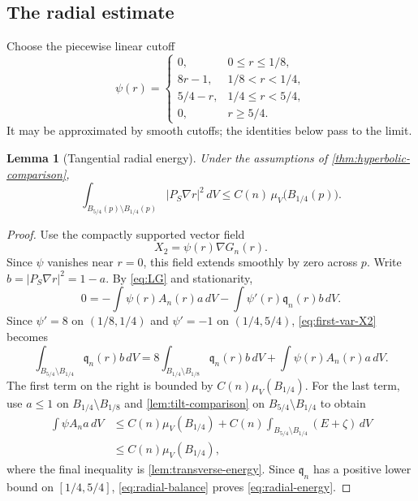 \documentclass[11pt,reqno]{amsart}
\numberwithin{equation}{section}
\newtheorem{lemma}[lemma]{Lemma}
\theoremstyle{definition}
\theoremstyle{remark}
\begin{document}
\subsection{The radial estimate}\label{sec:radial}

Choose the piecewise linear cutoff
\begin{equation}\label{eq:psi}
 \psi(r)=
 \begin{cases}
 0,&0\le r\le1/8,\\
 8r-1,&1/8<r<1/4,\\
 5/4-r,&1/4\le r<5/4,\\
 0,&r\ge5/4.
 \end{cases}
\end{equation}
It may be approximated by smooth cutoffs; the identities below pass to the limit.

\begin{lemma}[Tangential radial energy]\label{lem:radial-energy}
Under the assumptions of \cref{thm:hyperbolic-comparison},
\begin{equation}\label{eq:radial-energy}
 \int_{B_{5/4}(p)\setminus B_{1/4}(p)}|P_S\nabla r|^2\,dV
 \le C(n)\,\mu_V\bigl(B_{1/4}(p)\bigr).
\end{equation}
\end{lemma}

\begin{proof}
Use the compactly supported vector field
\[
 X_2=\psi(r)\nabla G_n(r).
\]
Since $\psi$ vanishes near $r=0$, this field extends smoothly by zero across
$p$.
Write $b=|P_S\nabla r|^2=1-a$.  By \eqref{eq:LG} and stationarity,
\begin{equation}\label{eq:first-var-X2}
 0=-\int\psi(r)A_n(r)a\,dV
   -\int\psi'(r)\mathfrak q_n(r)b\,dV.
\end{equation}
Since $\psi'=8$ on $(1/8,1/4)$ and $\psi'=-1$ on $(1/4,5/4)$, \eqref{eq:first-var-X2} becomes
\begin{equation}\label{eq:radial-balance}
 \int_{B_{5/4}\setminus B_{1/4}}\mathfrak q_n(r)b\,dV
 =8\int_{B_{1/4}\setminus B_{1/8}}\mathfrak q_n(r)b\,dV
  +\int\psi(r)A_n(r)a\,dV.
\end{equation}
The first term on the right is bounded by $C(n)\mu_V(B_{1/4})$.  For the
last term, use $a\le1$ on $B_{1/4}\setminus B_{1/8}$ and
\cref{lem:tilt-comparison} on $B_{5/4}\setminus B_{1/4}$ to obtain
\begin{align*}
 \int\psi A_na\,dV
 &\le C(n)\mu_V(B_{1/4})
 +C(n)\int_{B_{5/4}\setminus B_{1/4}}(E+\zeta)\,dV\\
 &\le C(n)\mu_V(B_{1/4}),
\end{align*}
where the final inequality is \cref{lem:transverse-energy}.  Since
$\mathfrak q_n$ has a positive lower bound on $[1/4,5/4]$,
\eqref{eq:radial-balance} proves \eqref{eq:radial-energy}.
\end{proof}
\end{document}
